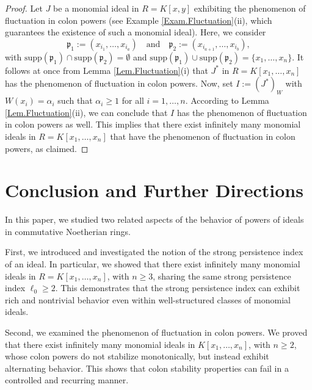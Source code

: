 \documentclass[11pt]{amsart}
\begin{document}
\begin{proof}
Let $J$ be a monomial ideal in $R =K[x,y]$ exhibiting the phenomenon of fluctuation in colon powers
 (see Example \ref{Exam.Fluctuation}(ii), which guarantees the existence of such a monomial  ideal). 
 Here, we consider  $$\mathfrak{p}_1:=(x_{i_1}, \ldots, x_{i_a}) \quad \text{and} \quad  \mathfrak{p}_2:=(x_{i_{a+1}}, \ldots, x_{i_b}),$$
  with  $\mathrm{supp}(\mathfrak{p}_1) \cap  \mathrm{supp}(\mathfrak{p}_2)=\emptyset$   and
  $\mathrm{supp}(\mathfrak{p}_1) \cup \mathrm{supp}(\mathfrak{p}_2) =\{x_1, \ldots, x_n\}$. 
 It follows at once from  Lemma  \ref{Lem.Fluctuation}(i) that  $J^*$ in $R=K[x_1, \ldots, x_n]$
 has the phenomenon  of  fluctuation in colon powers. Now, set   $I:=(J^*)_W$ with $W(x_i)=\alpha_i$ such that $\alpha_i \geq 1$ for all $i=1, \ldots, n$. 
 According to Lemma  \ref{Lem.Fluctuation}(ii), we can conclude that   $I$  has the phenomenon  of  fluctuation in colon powers as well. 
 This implies that    there exist infinitely many  monomial ideals  in     $R=K[x_1, \ldots, x_n]$    that  have  the  phenomenon  of
   fluctuation in colon powers, as claimed.  
\end{proof}




\section{Conclusion and Further Directions}

In this paper, we studied two related aspects of the behavior of powers of ideals in commutative Noetherian rings. 

First, we introduced and investigated the notion of the strong persistence index of an ideal. In particular, we showed that there exist infinitely many monomial ideals in $R=K[x_1,\ldots,x_n]$, with $n \geq 3$, sharing the same strong persistence index $\ell_0 \geq 2$. This demonstrates that the strong persistence index can exhibit rich and nontrivial behavior even within well-structured classes of monomial ideals.

Second, we examined the phenomenon of fluctuation in colon powers. We proved that there exist infinitely many monomial ideals in $K[x_1,\ldots,x_n]$, with $n \geq 2$, whose colon powers do not stabilize monotonically, but instead exhibit alternating behavior. This shows that colon stability properties can fail in a controlled and recurring manner.
\end{document}
